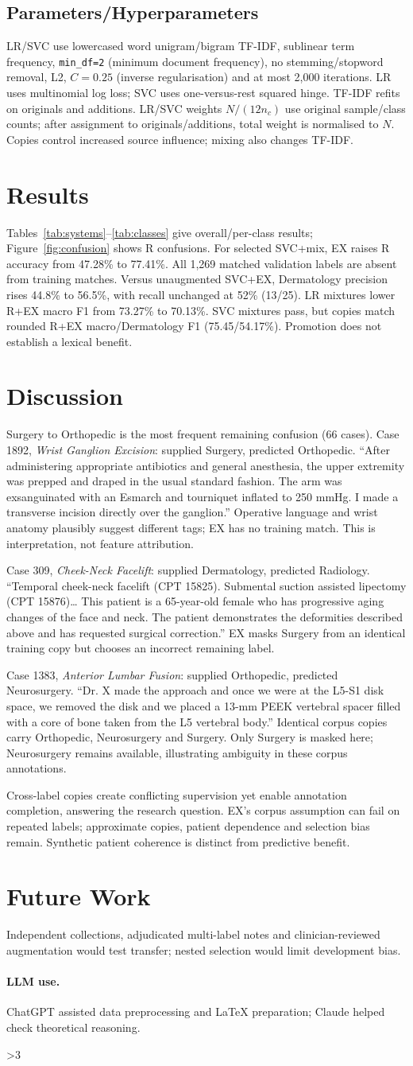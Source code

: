 \documentclass[twocolumn,10pt]{article}
\newcommand{\AugmentationOutcome}{LR mixtures lower R+EX macro F1
from 73.27\% to 70.13\%. SVC mixtures pass, but copies match rounded R+EX
macro/Dermatology F1 (75.45/54.17\%).
Promotion does not establish a lexical benefit.}
\newcommand{\MainResultSummary}{For selected SVC+mix, EX raises R accuracy
from 47.28\% to 77.41\%. All 1,269 matched validation labels are absent
from training matches. Versus unaugmented SVC+EX, Dermatology
precision rises 44.8\% to 56.5\%, with recall unchanged at 52\% (13/25).}
\newcommand{\ErrorDiscussion}{Case 1892, \emph{Wrist Ganglion Excision}: supplied Surgery, predicted Orthopedic.
``After administering appropriate antibiotics and general anesthesia, the upper
extremity was prepped and draped in the usual standard fashion. The arm was
exsanguinated with an Esmarch and tourniquet inflated to 250 mmHg. I made a
transverse incision directly over the ganglion.'' Operative language and wrist
anatomy plausibly suggest different tags; EX has no training match.
This is interpretation, not feature attribution.\par
Case 309, \emph{Cheek-Neck Facelift}: supplied Dermatology, predicted Radiology.
``Temporal cheek-neck facelift (CPT 15825). Submental suction assisted lipectomy
(CPT 15876)\ldots{} This patient is a 65-year-old female who has progressive aging
changes of the face and neck. The patient demonstrates the deformities described
above and has requested surgical correction.''
EX masks Surgery from an identical training copy but chooses an incorrect
remaining label.\par
Case 1383, \emph{Anterior Lumbar Fusion}: supplied Orthopedic, predicted Neurosurgery.
``Dr. X made the approach and once we were at the L5-S1 disk space, we removed
the disk and we placed a 13-mm PEEK vertebral spacer filled with a core of bone
taken from the L5 vertebral body.'' Identical corpus copies carry Orthopedic,
Neurosurgery and Surgery. Only Surgery is masked here; Neurosurgery remains
available, illustrating ambiguity in these corpus annotations.\par}
\newcounter{bodypages}
\newcounter{documentpagecount}
\begin{document}
\subsection{Parameters/Hyperparameters}
LR/SVC use lowercased word unigram/bigram TF-IDF, sublinear term frequency,
\texttt{min\_df=2} (minimum document frequency), no stemming/stopword removal,
L2, $C=0.25$ (inverse
regularisation) and at most 2,000 iterations. LR uses multinomial log loss;
SVC uses one-versus-rest squared hinge.
TF-IDF refits on originals and additions. LR/SVC weights $N/(12n_c)$ use
original sample/class counts; after assignment to originals/additions, total
weight is normalised to $N$. Copies control increased source influence;
mixing also changes TF-IDF.

\section{Results}
Tables~\ref{tab:systems}--\ref{tab:classes} give overall/per-class results;
Figure~\ref{fig:confusion} shows R confusions.
\MainResultSummary{} \AugmentationOutcome{}

\section{Discussion}
Surgery to Orthopedic is the most frequent remaining confusion (66 cases).
\ErrorDiscussion{}
Cross-label copies create conflicting supervision yet enable annotation
completion, answering the research question. EX's corpus assumption can fail
on repeated labels; approximate copies, patient dependence and selection bias
remain. Synthetic patient coherence is distinct from predictive benefit.

\section{Future Work}
Independent collections, adjudicated multi-label notes and clinician-reviewed
augmentation would test transfer; nested selection would limit development bias.

\paragraph{LLM use.}
ChatGPT assisted data preprocessing and LaTeX preparation;
Claude helped check theoretical reasoning.

\setcounter{bodypages}{\value{page}}
\renewcommand{\refname}{Bibliography}
\begingroup
\small
\setlength{\bibsep}{2pt}

\endgroup

\clearpage
\setcounter{documentpagecount}{\value{page}}
\addtocounter{documentpagecount}{-1}
\ifnum\value{documentpagecount}>3
\fi
\end{document}
